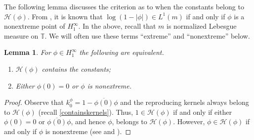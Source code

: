 \documentclass[11pt]{amsart}
\def\T{\mathbb{T}}
\def\HH{{\mathcal H}}
\numberwithin{equation}{section}
\theoremstyle{plain}
\newtheorem{lemma}[equation]{Lemma}
\theoremstyle{definition}
\begin{document}
The following lemma discusses the criterion as to when the constants belong to  $\HH(\phi)$. From   \cite[Thm.~6.7]{Hb1-book}, it is known that  $\log(1 - |\phi|) \in L^1(m)$ if and only if $\phi$ is a nonextreme point of $H^{\infty}_{1}$. In the above, recall that $m$ is normalized Lebesgue measure on $\T$. We will often use these terms ``extreme'' and ``nonextreme'' below. 

\begin{lemma}\label{Hbcopnstants}
For $\phi \in H^{\infty}_{1}$ the following are equivalent. 
\begin{enumerate}
\item $\HH(\phi)$ contains the constants; 
\item Either $\phi(0) = 0$ or $\phi$ is nonextreme.
\end{enumerate}
\end{lemma}

\begin{proof}
Observe that $k_0^{\phi}=1-\overline{\phi(0)}\phi$ and the reproducing kernels always belong to $\HH(\phi)$ (recall \eqref{containskernels}). Thus, $1\in \HH(\phi)$ if and only if either $\phi(0) = 0$ or $\overline{\phi(0)}\phi$, and hence $\phi$, belongs to $\HH(\phi)$.  However, $\phi\in \HH(\phi)$ if and only if $\phi$ is nonextreme (see \cite[Cor.~23.24]{Hb2-book} and \cite[Cor.~25.8]{Hb2-book}). 
\end{proof}
\end{document}
